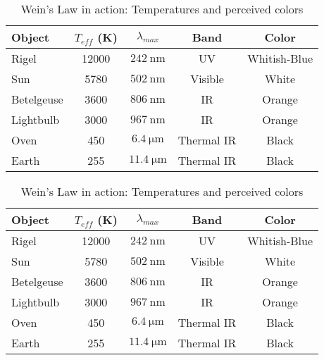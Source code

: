 \begin{table}
\begin{center}
\caption{Wein's Law in action: Temperatures and perceived colors}
\label{tab:weins_results}
\begin{tabular}{@{}lcccc@{}} \toprule
Object & $T_{eff}$ (K) & $\lambda_{max}$ & Band & Color\\ \midrule
Rigel	&12000	& $\SI{242}{\nano\metre}$ 	& UV	& Whitish-Blue\\
Sun		&5780		& $\SI{502}{\nano\metre}$ 	& Visible	& White\\
Betelgeuse	&3600	& $\SI{806}{\nano\metre}$ 	& IR	& Orange\\
Lightbulb	&3000	& $\SI{967}{\nano\metre}$ 	& IR	& Orange\\
Oven	&450	& $\SI{6.4}{\micro\metre}$ 	& Thermal IR	& Black\\
Earth	&255	& $\SI{11.4}{\micro\metre}$ 	& Thermal IR	& Black\\ \bottomrule
\end{tabular}
\end{center}
\end{table}

\begin{table}
\centering
\caption{Wein's Law in action: Temperatures and perceived colors}
\label{tab:weins_results}

\begin{tabular}{@{}lcccc@{}} \toprule
Object & $T_{eff}$ (K) & $\lambda_{max}$ & Band & Color\\ \midrule
Rigel	&12000	& $\SI{242}{\nano\metre}$ 	& UV	& Whitish-Blue\\
Sun		&5780		& $\SI{502}{\nano\metre}$ 	& Visible	& White\\
Betelgeuse	&3600	& $\SI{806}{\nano\metre}$ 	& IR	& Orange\\
Lightbulb	&3000	& $\SI{967}{\nano\metre}$ 	& IR	& Orange\\
Oven	&450	& $\SI{6.4}{\micro\metre}$ 	& Thermal IR	& Black\\
Earth	&255	& $\SI{11.4}{\micro\metre}$ 	& Thermal IR	& Black\\ \bottomrule
\end{tabular}

\end{table}


